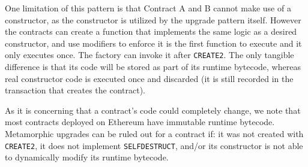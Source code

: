 One limitation of this pattern is that Contract A and B cannot make use of a constructor, as the constructor is utilized by the upgrade pattern itself. However the contracts can create a function that implements the same logic as a desired constructor, and use modifiers to enforce it is the first function to execute and it only executes once. The factory can invoke it after \texttt{CREATE2}. The only tangible difference is that its code will be stored as part of its runtime bytecode, whereas real constructor code is executed once and discarded (it is still recorded in the transaction that creates the contract). 

As it is concerning that a contract's code could completely change, we note that most contracts deployed on Ethereum have immutable runtime bytecode. Metamorphic upgrades can be ruled out for a contract if: it was not created with \texttt{CREATE2}, it does not implement \texttt{SELFDESTRUCT}, and/or its constructor is not able to dynamically modify its runtime bytecode. 






